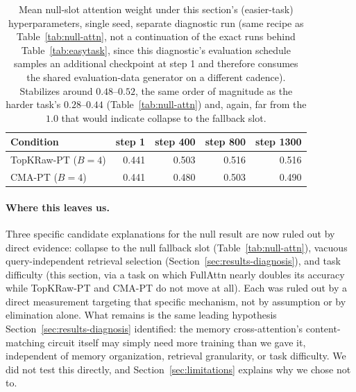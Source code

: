 \documentclass[11pt]{article}
\begin{document}
\begin{table}[H]
\centering
\small
\begin{tabular}{lrrrr}
\toprule
Condition & step 1 & step 400 & step 800 & step 1300 \\
\midrule
TopKRaw-PT ($B{=}4$) & 0.441 & 0.503 & 0.516 & 0.516 \\
CMA-PT ($B{=}4$) & 0.441 & 0.480 & 0.503 & 0.490 \\
\bottomrule
\end{tabular}
\caption{Mean null-slot attention weight under this section's (easier-task) hyperparameters,
single seed, separate diagnostic run (same recipe as Table~\ref{tab:null-attn}, not a
continuation of the exact runs behind Table~\ref{tab:easytask}, since this diagnostic's
evaluation schedule samples an additional checkpoint at step 1 and therefore consumes the shared
evaluation-data generator on a different cadence). Stabilizes around $0.48$--$0.52$, the same
order of magnitude as the harder task's $0.28$--$0.44$ (Table~\ref{tab:null-attn}) and, again, far
from the $1.0$ that would indicate collapse to the fallback slot.}
\label{tab:null-attn-easytask}
\end{table}

\paragraph{Where this leaves us.} Three specific candidate explanations for the null result are
now ruled out by direct evidence: collapse to the null fallback slot (Table~\ref{tab:null-attn}),
vacuous query-independent retrieval selection (Section~\ref{sec:results-diagnosis}), and task
difficulty (this section, via a task on which FullAttn nearly doubles its accuracy while
TopKRaw-PT and CMA-PT do not move at all). Each was ruled out by a direct measurement targeting
that specific mechanism, not by assumption or by elimination alone. What remains is the same
leading hypothesis Section~\ref{sec:results-diagnosis} identified: the memory cross-attention's
content-matching circuit itself may simply need more training than we gave it, independent of
memory organization, retrieval granularity, or task difficulty. We did not test this directly, and
Section~\ref{sec:limitations} explains why we chose not to.
\end{document}
